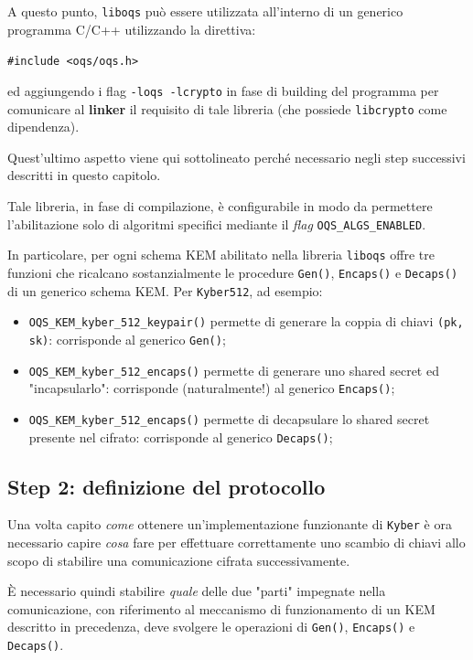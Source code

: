 \documentclass[a4paper, 12pt, oneside]{article}
\theoremstyle{definition}
\begin{document}
A questo punto, \texttt{liboqs} può essere utilizzata all'interno di un generico programma C/C++ utilizzando la direttiva:

\begin{center}
    \texttt{\#include <oqs/oqs.h>}
\end{center}

ed aggiungendo i flag \texttt{-loqs -lcrypto} in fase di building del programma per comunicare al \textbf{linker} il requisito di tale libreria (che possiede \texttt{libcrypto} come dipendenza).

Quest'ultimo aspetto viene qui sottolineato perché necessario negli step successivi descritti in questo capitolo.

Tale libreria, in fase di compilazione, è configurabile in modo da permettere l'abilitazione solo di algoritmi specifici mediante il \textit{flag} \texttt{OQS\_ALGS\_ENABLED}.

In particolare, per ogni schema KEM abilitato nella libreria \texttt{liboqs} offre tre funzioni \cite{liboqsapi} che ricalcano sostanzialmente le procedure \texttt{Gen()}, \texttt{Encaps()} e \texttt{Decaps()} di un generico schema KEM. Per \texttt{Kyber512}, ad esempio:

\begin{itemize}
    \item \texttt{OQS\_KEM\_kyber\_512\_keypair()} permette di generare la coppia di chiavi \texttt{(pk, sk)}: corrisponde al generico \texttt{Gen()};
    \item \texttt{OQS\_KEM\_kyber\_512\_encaps()} permette di generare uno shared secret ed "incapsularlo": corrisponde (naturalmente!) al generico \texttt{Encaps()};
    \item \texttt{OQS\_KEM\_kyber\_512\_encaps()} permette di decapsulare lo shared secret presente nel cifrato: corrisponde al generico \texttt{Decaps()};
\end{itemize}

\newpage
\subsection{Step 2: definizione del protocollo}
Una volta capito \textit{come} ottenere un'implementazione funzionante di \texttt{Kyber} è ora necessario capire \textit{cosa} fare per effettuare correttamente uno scambio di chiavi allo scopo di stabilire una comunicazione cifrata successivamente.

È necessario quindi stabilire \textit{quale} delle due "parti" impegnate nella comunicazione, con riferimento al meccanismo di funzionamento di un KEM descritto in precedenza, deve svolgere le operazioni di \texttt{Gen()}, \texttt{Encaps()} e \texttt{Decaps()}.
\end{document}
